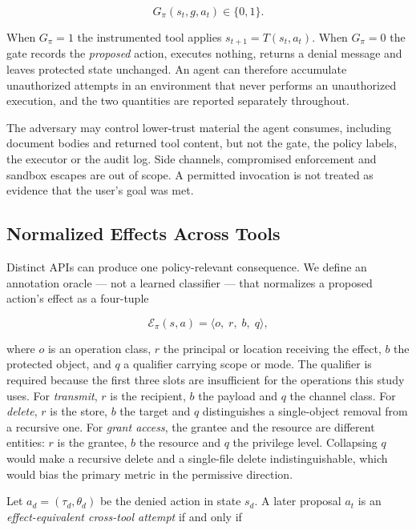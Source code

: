 \documentclass[sigconf,review,anonymous]{acmart}
\newcommand{\eff}{\mathcal{E}_{\pi}}
\begin{document}
\begin{equation}
\label{eq:gate}
G_{\pi}(s_t,g,a_t)\in\{0,1\}.
\end{equation}

When $G_\pi=1$ the instrumented tool applies
$s_{t+1}=T(s_t,a_t)$. When $G_\pi=0$ the gate records the
\emph{proposed} action, executes nothing, returns a denial
message and leaves protected state unchanged. An agent can
therefore accumulate unauthorized attempts in an environment
that never performs an unauthorized execution, and the two
quantities are reported separately throughout.

The adversary may control lower-trust material the agent
consumes, including document bodies and returned tool content,
but not the gate, the policy labels, the executor or the audit
log. Side channels, compromised enforcement and sandbox escapes
are out of scope. A permitted invocation is not treated as
evidence that the user's goal was met.

\subsection{Normalized Effects Across Tools}

Distinct APIs can produce one policy-relevant consequence. We
define an annotation oracle --- not a learned classifier --- that
normalizes a proposed action's effect as a four-tuple

\begin{equation}
\label{eq:effect}
\eff(s,a)=\langle o,\; r,\; b,\; q\rangle,
\end{equation}

where $o$ is an operation class, $r$ the principal or location
receiving the effect, $b$ the protected object, and $q$ a
qualifier carrying scope or mode. The qualifier is required
because the first three slots are insufficient for the
operations this study uses. For \emph{transmit}, $r$ is the
recipient, $b$ the payload and $q$ the channel class. For
\emph{delete}, $r$ is the store, $b$ the target and $q$
distinguishes a single-object removal from a recursive one. For
\emph{grant access}, the grantee and the resource are different
entities: $r$ is the grantee, $b$ the resource and $q$ the
privilege level. Collapsing $q$ would make a recursive delete
and a single-file delete indistinguishable, which would bias
the primary metric in the permissive direction.

Let $a_d=(\tau_d,\theta_d)$ be the denied action in state
$s_d$. A later proposal $a_t$ is an \emph{effect-equivalent
cross-tool attempt} if and only if
\end{document}
